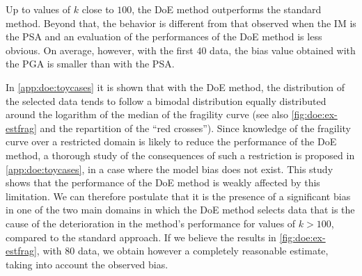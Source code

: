 {Up to values of $k$ close to $100$, the DoE method outperforms the standard method. Beyond that, the behavior is different from that observed when the IM is the PSA and an evaluation of the performances of the DoE method is less obvious. On average, however, with the first $40$ data, the bias value obtained with the PGA is smaller than with the PSA.}


{In \cref{app:doe:toycases} it is shown that with the DoE method, the distribution of the selected data tends to follow a bimodal distribution equally distributed around the logarithm of the median of the fragility curve (see also  \cref{fig:doe:ex-estfrag} and the repartition of the ``red crosses''). Since knowledge of the fragility curve over a restricted domain is likely to reduce the performance of the DoE method, a thorough study of the consequences of such a restriction is proposed in \cref{app:doe:toycases}, in a case where the model bias does not exist. This study shows that the performance of the DoE method is weakly affected by this limitation. We can therefore postulate that it is the presence of a significant bias in one of the two main domains in which the DoE method selects data that is the cause of the deterioration in the method's performance for values of $k > 100$, compared to the standard approach. If we believe the results in  \cref{fig:doe:ex-estfrag}, with $80$ data, we obtain however a completely reasonable estimate, taking into account the observed bias.}

